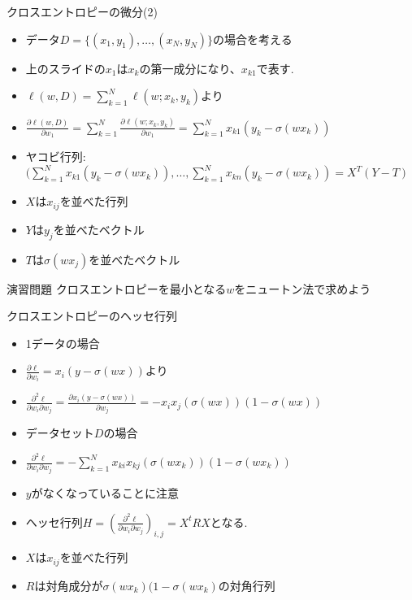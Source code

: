 \begin{frame}{クロスエントロピーの微分(2)}
\begin{itemize}
\item データ$D =  \{(x_1, y_1), \ldots, (x_N,y_N)\}$の場合を考える
  \item 上のスライドの$x_1$は$x_k$の第一成分になり、$x_{k1}$で表す.
\item $\ell(w, D) = \sum_{k=1}^N \ell(w;x_k, y_k)$より
\item $\frac{\partial \ell(w,D)}{\partial w_1} = \sum_{k=1}^N \frac{\partial\ell(w;x_k, y_k)}{\partial w_1} = \sum_{k=1}^N x_{k1}(y_k - \sigma(wx_k))$
\item ヤコビ行列:
  $(\sum_{k=1}^N x_{k1}(y_k - \sigma(wx_k)), \ldots, \sum_{k=1}^N x_{kn}(y_k - \sigma(wx_k))= X^T (Y - T)$
  \item $X$は$x_{ij}$を並べた行列
  \item $Y$は$y_j$を並べたベクトル
  \item $T$は$\sigma(wx_j)$を並べたベクトル
\end{itemize}
\end{frame}

\begin{frame}{演習問題}
クロスエントロピーを最小となる$w$をニュートン法で求めよう
\end{frame}

\begin{frame}{クロスエントロピーのヘッセ行列}
\begin{itemize}
\item 1データの場合
  \item $\frac{\partial \ell}{\partial w_i} = x_i(y - \sigma(wx))$より
  \item $\frac{\partial^2 \ell}{\partial w_i \partial w_j} = \frac{\partial x_i(y - \sigma(wx))}{\partial w_j} = -x_i x_j (\sigma(wx))(1 - \sigma(wx))$
\item データセット$D$の場合
  \item $\frac{\partial^2 \ell}{\partial w_i \partial w_j}  = - \sum_{k=1}^Nx_{ki} x_{kj} (\sigma(wx_k))(1 - \sigma(wx_k))$
  \item $y$がなくなっていることに注意
  \item ヘッセ行列$H = (\frac{\partial^2 \ell}{\partial w_i \partial w_j})_{i,j} = X^tRX$となる.
    \item $X$は$x_{ij}$を並べた行列
    \item $R$は対角成分が$\sigma(wx_k)(1 - \sigma(wx_k)$の対角行列
\end{itemize}
\end{frame}

